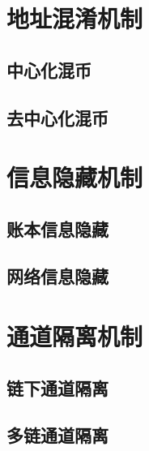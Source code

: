 \section{地址混淆机制}

\subsection{中心化混币}

\subsection{去中心化混币}

\section{信息隐藏机制}

\subsection{账本信息隐藏}

\subsection{网络信息隐藏}

\section{通道隔离机制}

\subsection{链下通道隔离}

\subsection{多链通道隔离}

